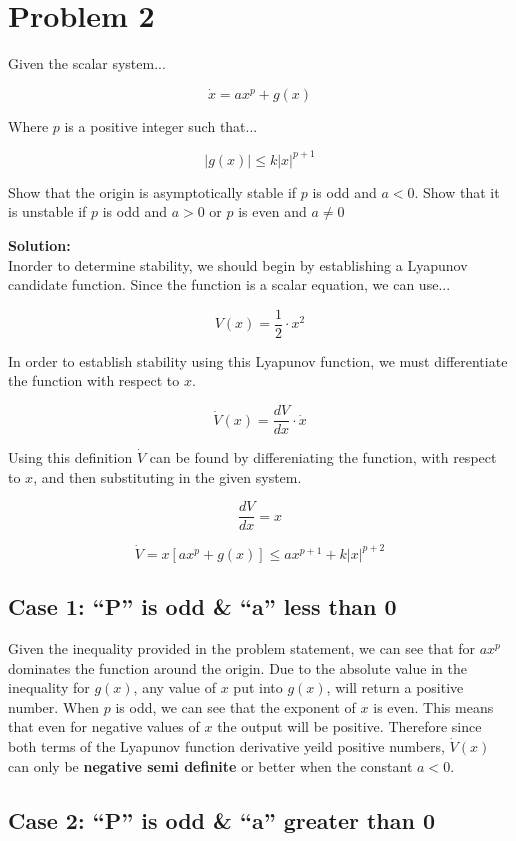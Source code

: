 \section*{Problem 2}

Given the scalar system...

$$
\dot{x} = ax^p + g(x)
$$

\noindent Where $p$ is a positive integer such that...

$$
|g(x)| \leq k|x|^{p+1}
$$

\noindent Show that the origin is asymptotically stable if $p$ is odd and $a<0$. Show that it is unstable if $p$ is odd and $a>0$ or $p$ is even and $a\neq0$

\noindent \textbf{Solution:} \\

\noindent Inorder to determine stability, we should begin by establishing a Lyapunov candidate function. Since the function is a scalar equation, we can use...

$$V(x) = \frac{1}{2}\cdot x^2$$

\noindent In order to establish stability using this Lyapunov function, we must differentiate the function with respect to $x$.

$$
\dot{V}(x) = \frac{dV}{dx} \cdot \dot{x}
$$

\noindent Using this definition $\dot{V}$ can be found by differeniating the function, with respect to $x$, and then substituting in the given system.

$$
\frac{dV}{dx} = x
$$

$$
\dot{V} = x[ax^p + g(x)] \leq ax^{p+1} + k|x|^{p+2}
$$

\subsection*{Case 1: ``P'' is odd \& ``a'' less than 0 }

Given the inequality provided in the problem statement, we can see that for $ax^p$ dominates the function around the origin. Due to the absolute value in the inequality for $g(x)$, any value of $x$ put into $g(x)$, will return a positive number. When $p$ is odd, we can see that the exponent of $x$ is even. This means that even for negative values of $x$ the output will be positive. Therefore since both terms of the Lyapunov function derivative yeild positive numbers, $\dot{V}(x)$ can only be \textbf{negative semi definite} or better when the constant $a < 0$.

\subsection*{Case 2: ``P'' is odd \& ``a'' greater than 0 }


